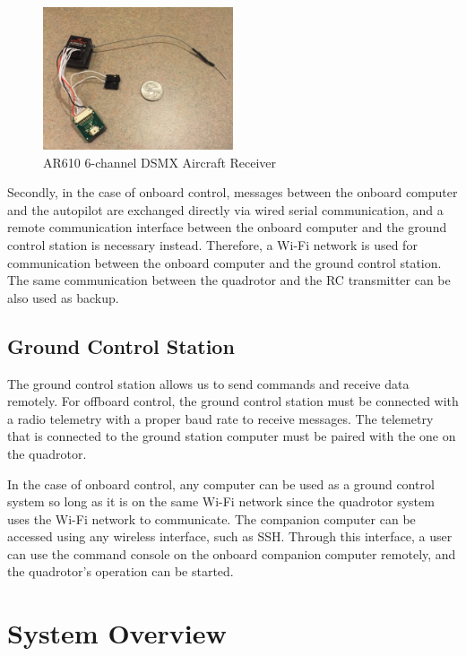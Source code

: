 \begin{figure}
    \centering
    \includegraphics[width=0.5\textwidth]{graphics/rc.jpg}
    \caption{AR610 6-channel DSMX Aircraft Receiver}
    \label{fig:receiver}
\end{figure}

Secondly, in the case of onboard control, messages between the onboard computer and the autopilot are exchanged directly via wired serial communication, and a remote communication interface between the onboard computer and the ground control station is necessary instead. Therefore, a Wi-Fi network is used for communication between the onboard computer and the ground control station. The same communication between the quadrotor and the RC transmitter can be also used as backup. 

\subsection{Ground Control Station}

The ground control station allows us to send commands and receive data remotely. For offboard control, the ground control station must be connected with a radio telemetry with a proper baud rate to receive messages. The telemetry that is connected to the ground station computer must be paired with the one on the quadrotor. 

In the case of onboard control, any computer can be used as a ground control system so long as it is on the same Wi-Fi network since the quadrotor system uses the Wi-Fi network to communicate. The companion computer can be accessed using any wireless interface, such as SSH. Through this interface, a user can use the command console on the onboard companion computer remotely, and the quadrotor's operation can be started.

\section{System Overview}

